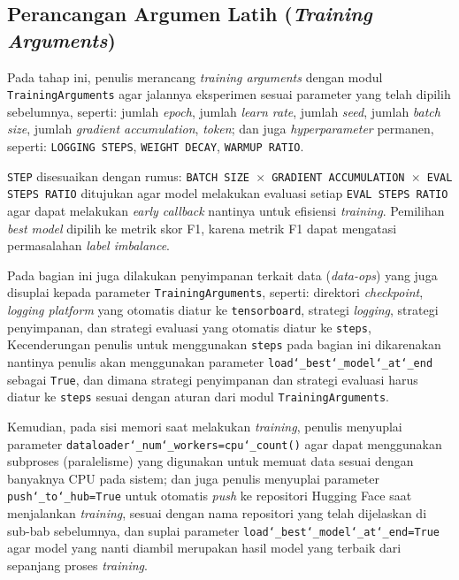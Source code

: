 \subsection{Perancangan Argumen Latih (\emph{Training Arguments})}
Pada tahap ini, penulis merancang \emph{training arguments} dengan modul \texttt{TrainingArguments} agar jalannya eksperimen sesuai parameter yang telah dipilih sebelumnya, seperti: jumlah \emph{epoch}, jumlah \emph{learn rate}, jumlah \emph{seed}, jumlah \emph{batch size}, jumlah \emph{gradient accumulation}, \emph{token}; dan juga \emph{hyperparameter} permanen, seperti:  \texttt{LOGGING STEPS}, \texttt{WEIGHT DECAY}, \texttt{WARMUP RATIO}. 

\texttt{STEP} disesuaikan dengan rumus: \texttt{BATCH SIZE $\times$ GRADIENT ACCUMULATION $\times$ EVAL STEPS RATIO} ditujukan agar model melakukan evaluasi setiap \texttt{EVAL STEPS RATIO} agar dapat melakukan \emph{early callback} nantinya untuk efisiensi \emph{training}. Pemilihan \emph{best model} dipilih ke metrik skor F1, karena metrik F1 dapat mengatasi permasalahan \emph{label imbalance}.

Pada bagian ini juga dilakukan penyimpanan terkait data (\emph{data-ops}) yang juga disuplai kepada parameter \texttt{TrainingArguments}, seperti: direktori \emph{checkpoint}, \emph{logging platform} yang otomatis diatur ke \texttt{tensorboard}, strategi \emph{logging}, strategi penyimpanan, dan strategi evaluasi yang otomatis diatur ke \texttt{steps}, Kecenderungan penulis untuk menggunakan \texttt{steps} pada bagian ini dikarenakan nantinya penulis akan menggunakan parameter \texttt{load\char`_best\char`_model\char`_at\char`_end} sebagai \texttt{True}, dan dimana strategi penyimpanan dan strategi evaluasi harus diatur ke \texttt{steps} sesuai dengan aturan dari modul \texttt{TrainingArguments}.

Kemudian, pada sisi memori saat melakukan \emph{training}, penulis menyuplai parameter \texttt{dataloader\char`_num\char`_workers=cpu\char`_count()} agar dapat menggunakan subproses (paralelisme) yang digunakan untuk memuat data sesuai dengan banyaknya CPU pada sistem; dan juga penulis menyuplai parameter \texttt{push\char`_to\char`_hub=True} untuk otomatis \emph{push} ke repositori Hugging Face saat menjalankan \emph{training}, sesuai dengan nama repositori yang telah dijelaskan di sub-bab sebelumnya, dan suplai parameter \texttt{load\char`_best\char`_model\char`_at\char`_end=True} agar model yang nanti diambil merupakan hasil model yang terbaik dari sepanjang proses \emph{training}.

